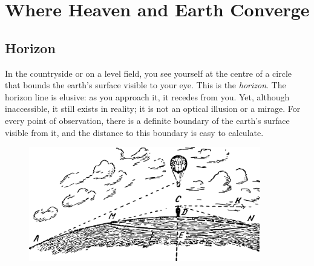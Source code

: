 

\chapter{Where Heaven and Earth Converge}
\label{ch-06}



	
\section{Horizon}
\label{sec-6.1}
In the countryside or on a level field, you see yourself at the centre of a circle that bounds the earth's surface visible to your eye. This is the \emph{horizon}. The horizon line is elusive: as you approach it, it recedes from you. Yet, although inaccessible, it still exists in reality; it is not an optical illusion or a mirage. For every point of observation, there is a definite boundary of the earth's surface visible from it, and the distance to this boundary is easy to calculate. 

\begin{figure}[h!]
\centering
\includegraphics[width=0.9\textwidth]{figures/ch-06/fig-098.pdf}
\end{figure}

